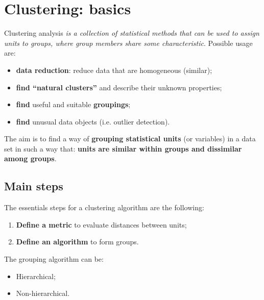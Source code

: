 \documentclass[12pt]{article}
\begin{document}
\maketitle
\tableofcontents
\listoffigures

\section{Clustering: basics}
	Clustering analysis \textit{is a collection of statistical methods that can be used to assign units
	to groups, where group members share some characteristic}. Possible usage are: 
	
	\begin{itemize}
		\item \textbf{data reduction}: reduce data that are homogeneous (similar);
		\item \textbf{find “natural clusters”} and describe their unknown properties;
		\item \textbf{find} useful and suitable \textbf{groupings};
		\item \textbf{find} unusual data objects (i.e. outlier detection).
	\end{itemize}

	The aim is to find a way of \textbf{grouping statistical units} (or variables) in a data
	set in such a way that:
	\textbf{units are similar within groups and dissimilar among groups}. 
	
	\subsection{Main steps}
		
		The essentials steps for a clustering algorithm are the following:
		
		\begin{enumerate}
			\item \textbf{Define a metric} to evaluate distances between units;
			\item \textbf{Define an algorithm} to form groups. 
		\end{enumerate}
	
		The grouping algorithm can be:
		
		\begin{itemize}
			\item Hierarchical;
			\item Non-hierarchical.
		\end{itemize}
	
\end{document}

